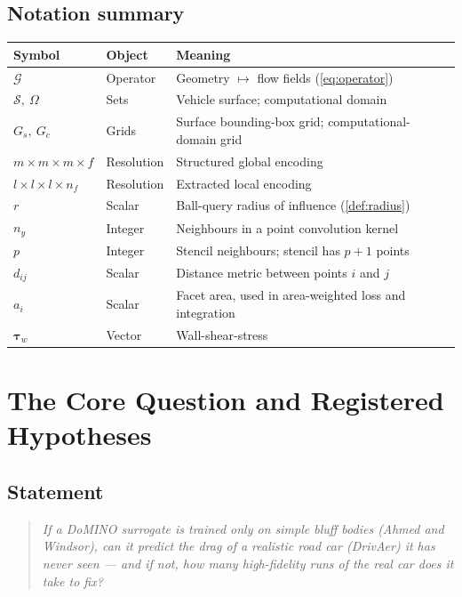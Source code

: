 \documentclass[10pt,a4paper]{article}
\theoremstyle{definition}
\newcommand{\calS}{\mathcal{S}}
\begin{document}
\subsection{Notation summary}

\begin{center}\small
\begin{tabular}{@{}llp{9.6cm}@{}}
\toprule
\textbf{Symbol} & \textbf{Object} & \textbf{Meaning} \\
\midrule
$\mathcal{G}$ & Operator & Geometry $\mapsto$ flow fields (\cref{eq:operator}) \\
$\calS,\ \Omega$ & Sets & Vehicle surface; computational domain \\
$G_s,\ G_c$ & Grids & Surface bounding-box grid; computational-domain grid \\
$m \times m \times m \times f$ & Resolution & Structured global encoding \\
$l \times l \times l \times n_f$ & Resolution & Extracted local encoding \\
$r$ & Scalar & Ball-query radius of influence (\cref{def:radius}) \\
$n_y$ & Integer & Neighbours in a point convolution kernel \\
$p$ & Integer & Stencil neighbours; stencil has $p+1$ points \\
$d_{ij}$ & Scalar & Distance metric between points $i$ and $j$ \\
$a_i$ & Scalar & Facet area, used in area-weighted loss and integration \\
$\boldsymbol{\tau}_w$ & Vector & Wall-shear-stress \\
\bottomrule
\end{tabular}
\end{center}

\section{The Core Question and Registered Hypotheses}
\label{sec:hypotheses}

\subsection{Statement}

\begin{quote}
\emph{If a DoMINO surrogate is trained only on simple bluff bodies (Ahmed and
Windsor), can it predict the drag of a realistic road car (DrivAer) it has never
seen --- and if not, how many high-fidelity runs of the real car does it take to
fix?}
\end{quote}
\end{document}
